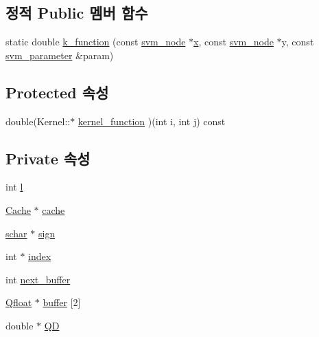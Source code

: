 \subsection*{정적 Public 멤버 함수}
\begin{DoxyCompactItemize}
\item 
static double \hyperlink{class_kernel_a6ff0d4ac64bf7fba29d2ca3433dd5127}{k\+\_\+function} (const \hyperlink{structsvm__node}{svm\+\_\+node} $\ast$\hyperlink{class_kernel_a725a35660c4309605c2628fa8290ce5f}{x}, const \hyperlink{structsvm__node}{svm\+\_\+node} $\ast$y, const \hyperlink{structsvm__parameter}{svm\+\_\+parameter} \&param)
\end{DoxyCompactItemize}
\subsection*{Protected 속성}
\begin{DoxyCompactItemize}
\item 
double(Kernel\+::$\ast$ \hyperlink{class_kernel_a575eeb588e8a5c62ff3228a35e255a02}{kernel\+\_\+function} )(int i, int j) const 
\end{DoxyCompactItemize}
\subsection*{Private 속성}
\begin{DoxyCompactItemize}
\item 
int \hyperlink{class_s_v_r___q_aa3420dab3d0b1eabdc0614c71321ab3c}{l}
\item 
\hyperlink{class_cache}{Cache} $\ast$ \hyperlink{class_s_v_r___q_acb75212bdcc8128a28b35601f8265828}{cache}
\item 
\hyperlink{svm_8cpp_a0fd9ce9d735064461bebfe6037026093}{schar} $\ast$ \hyperlink{class_s_v_r___q_a0255ad0a00ef589c69adc19a06527dfc}{sign}
\item 
int $\ast$ \hyperlink{class_s_v_r___q_a29e769c577358f518182ba3cbe255817}{index}
\item 
int \hyperlink{class_s_v_r___q_acbdbde823b714d30097648c9dc109524}{next\+\_\+buffer}
\item 
\hyperlink{svm_8cpp_a8755d90a54ecfb8d15051af3e0542592}{Qfloat} $\ast$ \hyperlink{class_s_v_r___q_a294d15ab4ee01b92c960a604afbd6f9f}{buffer} \mbox{[}2\mbox{]}
\item 
double $\ast$ \hyperlink{class_s_v_r___q_aaa4a8b37dbc15610de7fe46df8874e25}{Q\+D}
\end{DoxyCompactItemize}


